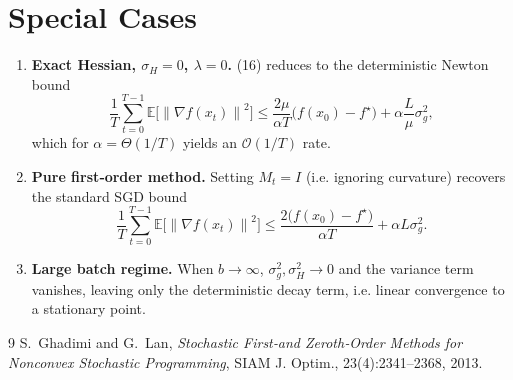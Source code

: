 \documentclass{article}
\newcommand{\E}{\mathbb{E}}
\newcommand{\norm}[1]{\left\|#1\right\|}
\begin{document}
\section*{Special Cases}
\begin{enumerate}
\item \textbf{Exact Hessian, $\sigma_{H}=0$, $\lambda=0$.}  
(16) reduces to the deterministic Newton bound
\[
\frac{1}{T}\sum_{t=0}^{T-1}\E\!\big[\norm{\nabla f(x_{t})}^{2}\big]
\le
\frac{2\mu}{\alpha T}\bigl(f(x_{0})-f^{\star}\bigr)
   +\alpha\frac{L}{\mu}\sigma_{g}^{2},
\]
which for $\alpha=\Theta(1/T)$ yields an $\mathcal{O}(1/T)$ rate.

\item \textbf{Pure first‑order method.}  
Setting $M_{t}=I$ (i.e. ignoring curvature) recovers the standard SGD bound
\[
\frac{1}{T}\sum_{t=0}^{T-1}\E\!\big[\norm{\nabla f(x_{t})}^{2}\big]
\le
\frac{2\bigl(f(x_{0})-f^{\star}\bigr)}{\alpha T}
   +\alpha L\sigma_{g}^{2}.
\]

\item \textbf{Large batch regime.}  
When $b\to\infty$, $\sigma_{g}^{2},\sigma_{H}^{2}\to0$ and the variance term vanishes, leaving only the deterministic decay term, i.e. linear convergence to a stationary point.
\end{enumerate}

\begin{thebibliography}{9}
S.~Ghadimi and G.~Lan, \emph{Stochastic First‑and Zeroth‑Order Methods for Nonconvex Stochastic Programming}, SIAM J. Optim., 23(4):2341–2368, 2013.
\end{thebibliography}
\end{document}
